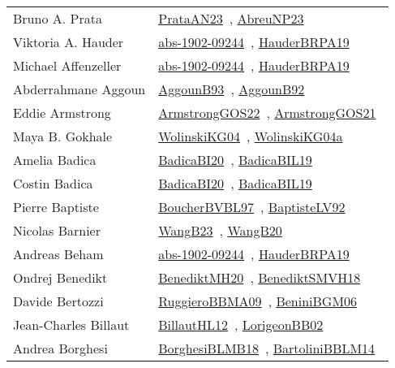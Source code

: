 {\begin{longtable}{p{4cm}p{20cm}}
Bruno A. Prata & \href{articles/PrataAN23.pdf}{PrataAN23}~\cite{PrataAN23}, \href{}{AbreuNP23}~\cite{AbreuNP23}\\
Viktoria A. Hauder & \href{articles/abs-1902-09244.pdf}{abs-1902-09244}~\cite{abs-1902-09244}, \href{articles/HauderBRPA19.pdf}{HauderBRPA19}~\cite{HauderBRPA19}\\
Michael Affenzeller & \href{articles/abs-1902-09244.pdf}{abs-1902-09244}~\cite{abs-1902-09244}, \href{articles/HauderBRPA19.pdf}{HauderBRPA19}~\cite{HauderBRPA19}\\
Abderrahmane Aggoun & \href{articles/AggounB93.pdf}{AggounB93}~\cite{AggounB93}, \href{}{AggounB92}~\cite{AggounB92}\\
Eddie Armstrong & \href{papers/ArmstrongGOS22.pdf}{ArmstrongGOS22}~\cite{ArmstrongGOS22}, \href{papers/ArmstrongGOS21.pdf}{ArmstrongGOS21}~\cite{ArmstrongGOS21}\\
Maya B. Gokhale & \href{papers/WolinskiKG04.pdf}{WolinskiKG04}~\cite{WolinskiKG04}, \href{}{WolinskiKG04a}~\cite{WolinskiKG04a}\\
Amelia Badica & \href{}{BadicaBI20}~\cite{BadicaBI20}, \href{papers/BadicaBIL19.pdf}{BadicaBIL19}~\cite{BadicaBIL19}\\
Costin Badica & \href{}{BadicaBI20}~\cite{BadicaBI20}, \href{papers/BadicaBIL19.pdf}{BadicaBIL19}~\cite{BadicaBIL19}\\
Pierre Baptiste & \href{}{BoucherBVBL97}~\cite{BoucherBVBL97}, \href{papers/BaptisteLV92.pdf}{BaptisteLV92}~\cite{BaptisteLV92}\\
Nicolas Barnier & \href{papers/WangB23.pdf}{WangB23}~\cite{WangB23}, \href{papers/WangB20.pdf}{WangB20}~\cite{WangB20}\\
Andreas Beham & \href{articles/abs-1902-09244.pdf}{abs-1902-09244}~\cite{abs-1902-09244}, \href{articles/HauderBRPA19.pdf}{HauderBRPA19}~\cite{HauderBRPA19}\\
Ondrej Benedikt & \href{articles/BenediktMH20.pdf}{BenediktMH20}~\cite{BenediktMH20}, \href{papers/BenediktSMVH18.pdf}{BenediktSMVH18}~\cite{BenediktSMVH18}\\
Davide Bertozzi & \href{articles/RuggieroBBMA09.pdf}{RuggieroBBMA09}~\cite{RuggieroBBMA09}, \href{papers/BeniniBGM06.pdf}{BeniniBGM06}~\cite{BeniniBGM06}\\
Jean{-}Charles Billaut & \href{papers/BillautHL12.pdf}{BillautHL12}~\cite{BillautHL12}, \href{}{LorigeonBB02}~\cite{LorigeonBB02}\\
Andrea Borghesi & \href{articles/BorghesiBLMB18.pdf}{BorghesiBLMB18}~\cite{BorghesiBLMB18}, \href{papers/BartoliniBBLM14.pdf}{BartoliniBBLM14}~\cite{BartoliniBBLM14}\\

\end{longtable}}

